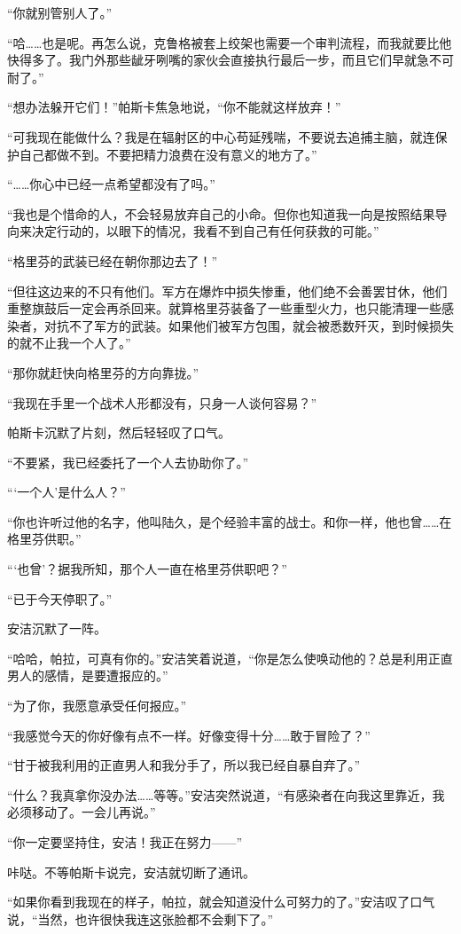 “你就别管别人了。”

“哈……也是呢。再怎么说，克鲁格被套上绞架也需要一个审判流程，而我就要比他快得多了。我门外那些龇牙咧嘴的家伙会直接执行最后一步，而且它们早就急不可耐了。”

“想办法躲开它们！”帕斯卡焦急地说，“你不能就这样放弃！”

“可我现在能做什么？我是在辐射区的中心苟延残喘，不要说去追捕主脑，就连保护自己都做不到。不要把精力浪费在没有意义的地方了。”

“……你心中已经一点希望都没有了吗。”

“我也是个惜命的人，不会轻易放弃自己的小命。但你也知道我一向是按照结果导向来决定行动的，以眼下的情况，我看不到自己有任何获救的可能。”

“格里芬的武装已经在朝你那边去了！”

“但往这边来的不只有他们。军方在爆炸中损失惨重，他们绝不会善罢甘休，他们重整旗鼓后一定会再杀回来。就算格里芬装备了一些重型火力，也只能清理一些感染者，对抗不了军方的武装。如果他们被军方包围，就会被悉数歼灭，到时候损失的就不止我一个人了。”

“那你就赶快向格里芬的方向靠拢。”

“我现在手里一个战术人形都没有，只身一人谈何容易？”

帕斯卡沉默了片刻，然后轻轻叹了口气。

“不要紧，我已经委托了一个人去协助你了。”

“‘一个人’是什么人？”

“你也许听过他的名字，他叫陆久，是个经验丰富的战士。和你一样，他也曾……在格里芬供职。”

“‘也曾’？据我所知，那个人一直在格里芬供职吧？”

“已于今天停职了。”

安洁沉默了一阵。

“哈哈，帕拉，可真有你的。”安洁笑着说道，“你是怎么使唤动他的？总是利用正直男人的感情，是要遭报应的。”

“为了你，我愿意承受任何报应。”

“我感觉今天的你好像有点不一样。好像变得十分……敢于冒险了？”

“甘于被我利用的正直男人和我分手了，所以我已经自暴自弃了。”

“什么？我真拿你没办法……等等。”安洁突然说道，“有感染者在向我这里靠近，我必须移动了。一会儿再说。”

“你一定要坚持住，安洁！我正在努力——”

咔哒。不等帕斯卡说完，安洁就切断了通讯。

“如果你看到我现在的样子，帕拉，就会知道没什么可努力的了。”安洁叹了口气说，“当然，也许很快我连这张脸都不会剩下了。”

